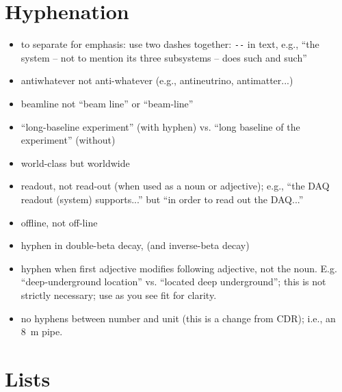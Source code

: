 \section{Hyphenation}
\label{sec:english-hyphen}

\begin{itemize}
\item to separate for emphasis: use two dashes together: \verb|--| in text, e.g.,  ``the system -- not to mention its three subsystems -- does such and such'' 
\item antiwhatever not anti-whatever (e.g., antineutrino, antimatter...)
\item beamline not ``beam line'' or ``beam-line'' 
\item ``long-baseline experiment''  (with hyphen) vs. ``long baseline of the experiment'' (without)
\item world-class but worldwide   
\item readout, not read-out (when used as a noun or adjective); e.g., ``the DAQ readout (system) supports...'' but ``in order to read out the DAQ...''
\item offline, not off-line
\item hyphen in double-beta decay, (and inverse-beta decay)
\item hyphen when first adjective modifies following adjective, not the noun. E.g. ``deep-underground location'' vs. ``located deep underground'';  this is not strictly necessary; use as you see fit for clarity.
\item no hyphens between number and unit (this is a change from CDR); i.e., an \SI{8}{\meter} pipe.
\end{itemize}

\section{Lists}
\label{sec:english-lists}

